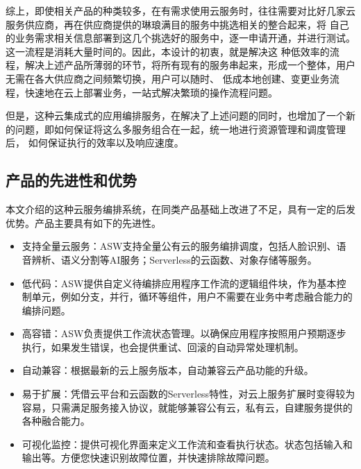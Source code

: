 %
%
%
%
%
%
%


综上，即使相关产品的种类较多，在有需求使用云服务时，往往需要对比好几家云服务供应商，再在供应商提供的琳琅满目的服务中挑选相关的整合起来，将
自己的业务需求相关信息部署到这几个挑选好的服务中，逐一申请开通，并进行测试。这一流程是消耗大量时间的。因此，本设计的初衷，就是解决这
种低效率的流程，解决上述产品所薄弱的环节，将所有现有的服务串起来，形成一个整体，用户无需在各大供应商之间频繁切换，用户可以随时、
低成本地创建、变更业务流程，快速地在云上部署业务，一站式解决繁琐的操作流程问题\cite{jydyyybp}。

但是，这种云集成式的应用编排服务，在解决了上述问题的同时，也增加了一个新的问题，即如何保证将这么多服务组合在一起，统一地进行资源管理和调度管理后，
如何保证执行的效率以及响应速度。

\subsection{产品的先进性和优势}
本文介绍的这种云服务编排系统，在同类产品基础上改进了不足，具有一定的后发优势。产品主要具有如下的先进性。

\begin{itemize}
    \item 支持全量云服务：ASW支持全量公有云的服务编排调度，包括人脸识别、语音辨析、语义分割等AI服务；Serverless的云函数、对象存储等服务。
    \item 低代码：ASW提供自定义待编排应用程序工作流的逻辑组件块，作为基本控制单元，例如分支，并行，循环等组件，用户不需要在业务中考虑融合能力的编排问题。
    \item 高容错：ASW负责提供工作流状态管理。以确保应用程序按照用户预期逐步执行，如果发生错误，也会提供重试、回滚的自动异常处理机制。
    \item 自动兼容：根据最新的云上服务版本，自动兼容云产品功能的升级。
    \item 易于扩展：凭借云平台和云函数的Serverless特性，对云上服务扩展时变得较为容易，只需满足服务接入协议，就能够兼容公有云，私有云，自建服务提供的各种融合能力。
    \item 可视化监控：提供可视化界面来定义工作流和查看执行状态。状态包括输入和输出等。方便您快速识别故障位置，并快速排除故障问题。
\end{itemize}



